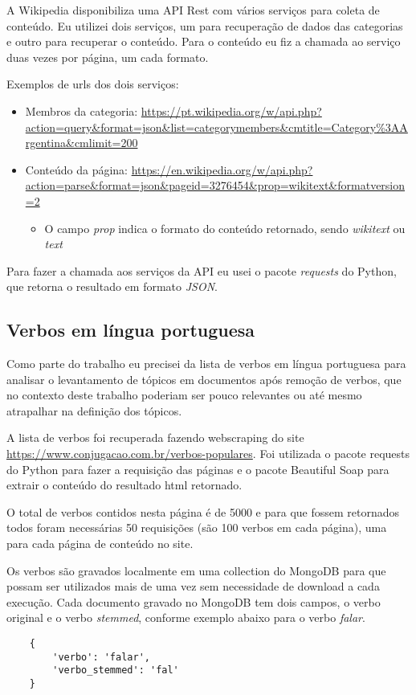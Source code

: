 A Wikipedia disponibiliza uma API Rest com vários serviços para coleta de conteúdo. Eu utilizei dois serviços, um para recuperação de dados das 
categorias e outro para recuperar o conteúdo. Para o conteúdo eu fiz a chamada ao serviço duas vezes por página, um cada formato.

Exemplos de urls dos dois serviços:
\begin{itemize}
    \item Membros da categoria: \url{https://pt.wikipedia.org/w/api.php?action=query&format=json&list=categorymembers&cmtitle=Category%3AArgentina&cmlimit=200}
    \item Conteúdo da página: \url{https://en.wikipedia.org/w/api.php?action=parse&format=json&pageid=3276454&prop=wikitext&formatversion=2}
    \begin{itemize}
        \item O campo \textit{prop} indica o formato do conteúdo retornado, sendo \textit{wikitext} ou \textit{text}
    \end{itemize} 
\end{itemize}

Para fazer a chamada aos serviços da API eu usei o pacote \textit{requests} do Python, que retorna o resultado em formato \textit{JSON}.

\subsection{Verbos em língua portuguesa}

Como parte do trabalho eu precisei da lista de verbos em língua portuguesa para analisar o levantamento de tópicos em documentos após remoção de verbos, 
que no contexto deste trabalho poderiam ser pouco relevantes ou até mesmo atrapalhar na definição dos tópicos.

A lista de verbos foi recuperada fazendo webscraping do site \url{https://www.conjugacao.com.br/verbos-populares}. Foi utilizada o pacote requests do Python 
para fazer a requisição das páginas e o pacote Beautiful Soap para extrair o conteúdo do resultado html retornado.

O total de verbos contidos nesta página é de 5000 e para que fossem retornados todos foram necessárias 50 requisições (são 100 verbos em cada página), 
uma para cada página de conteúdo no site.

Os verbos são gravados localmente em uma collection do MongoDB para que possam ser utilizados mais de uma vez sem necessidade de download a cada execução.
Cada documento gravado no MongoDB tem dois campos, o verbo original e o verbo \textit{stemmed}, conforme exemplo abaixo para o verbo \textit{falar}.

\begin{lstlisting}
    {
        'verbo': 'falar',
        'verbo_stemmed': 'fal'
    }
\end{lstlisting}
